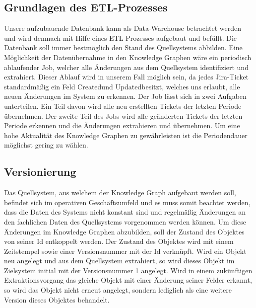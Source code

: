 \documentclass[10pt]{article}
\begin{document}
\subsection{Grundlagen des ETL-Prozesses}
Unsere aufzubauende Datenbank kann als Data-Warehouse betrachtet werden und wird demnach mit Hilfe eines ETL-Prozesses aufgebaut und befüllt. Die Datenbank soll immer bestmöglich den Stand des Quellsystems abbilden. Eine Möglichkeit der Datenübernahme in den Knowledge Graphen wäre ein periodisch ablaufender Job, welcher alle Änderungen aus dem Quellsystem identifiziert und extrahiert. Dieser Ablauf wird in unserem Fall möglich sein, da jedes Jira-Ticket standardmäßig ein Feld \glqq Created\grqq\:und \glqq Updated\grqq\:besitzt, welches uns erlaubt, alle neuen Änderungen im System zu erkennen. Der Job lässt sich in zwei Aufgaben unterteilen. Ein Teil davon wird alle neu erstellten Tickets der letzten Periode übernehmen. Der zweite Teil des Jobs wird alle geänderten Tickets der letzten Periode erkennen und die Änderungen extrahieren und übernehmen. Um eine hohe Aktualität des Knowledge Graphen zu gewährleisten ist die Periodendauer möglichst gering zu wählen. \\
\subsection{Versionierung}
Das Quellsystem, aus welchem der Knowledge Graph aufgebaut werden soll, befindet sich im operativen Geschäftsumfeld und es muss somit beachtet werden, dass die Daten des Systems nicht konstant sind und regelmäßig Änderungen an den fachlichen Daten des Quellsystems vorgenommen werden können. Um diese Änderungen im Knowledge Graphen abzubilden, soll der Zustand des Objektes von seiner Id entkoppelt werden. Der Zustand des Objektes wird mit einem Zeitstempel sowie einer Versionsnummer mit der Id verknüpft.
Wird ein Objekt neu angelegt und aus dem Quellsystem extrahiert, so wird dieses Objekt im Zielsystem initial mit der Versionsnummer 1 angelegt. Wird in einem zukünftigen Extraktionsvorgang das gleiche Objekt mit einer Änderung seiner Felder erkannt, so wird das Objekt nicht erneut angelegt, sondern lediglich als eine weitere Version dieses Objektes behandelt.
\end{document}
